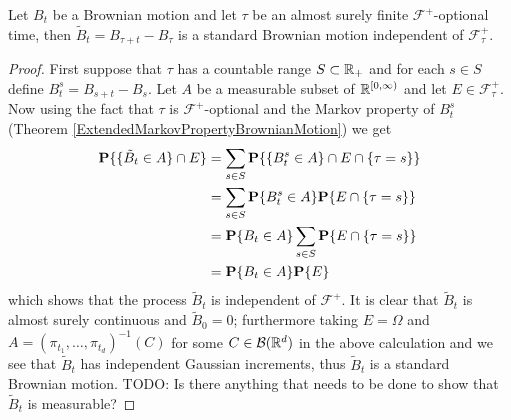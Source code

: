 \begin{thm}\label{StrongMarkovPropertyBrownianMotion}Let $B_t$ be a
  Brownian motion and let $\tau$ be an almost surely finite $\mathcal{F}^+$-optional
  time, then $\tilde{B}_t = B_{\tau + t} - B_\tau$ is a standard Brownian
  motion independent of $\mathcal{F}^+_\tau$.
\end{thm}
\begin{proof}
First suppose that $\tau$ has a countable range $S \subset \mathbb{R}_+$
and for each $s \in S$ define $B^s_t = B_{s+t} - B_s$.
Let $A$ be a
measurable subset of $\mathbb{R}^{[0,\infty)}$ and let $E \in
\mathcal{F}^+_\tau$.  Now using the fact that $\tau$ is
$\mathcal{F}^+$-optional and the Markov property of $B^s_t$ (Theorem
\ref{ExtendedMarkovPropertyBrownianMotion}) we get
\begin{align*}
\textbf{P}\{\lbrace \tilde{B}_t \in A \rbrace \cap E\} &= \sum_{s \in S}
\textbf{P}\{ \lbrace B^s_t
  \in A \rbrace \cap E \cap \lbrace \tau = s \rbrace \} \\
&=\sum_{s \in S} \textbf{P}\{ B^s_t
  \in A \} \textbf{P}\{ E \cap \lbrace \tau = s \rbrace \} \\
&=\textbf{P}\{ B_t
  \in A \} \sum_{s \in S} \textbf{P}\{ E \cap \lbrace \tau = s \rbrace \} \\
&= \textbf{P}\{ B_t  \in A \} \textbf{P}\{ E \} 
\end{align*}
which shows that the process $\tilde{B}_t$ is independent of
$\mathcal{F}^+$.  
It is clear that $\tilde{B}_t$ is almost surely continuous and $\tilde{B}_0 = 0$;
furthermore taking $E = \Omega$ and $A = (\pi_{t_1}, \dotsc,
\pi_{t_d})^{-1}(C)$ for some $C \in \mathcal{B}(\mathbb{R}^d)$ in the above calculation and we see
that $\tilde{B}_t$ has independent Gaussian increments, thus $\tilde{B}_t$ is a
standard Brownian motion.  TODO:  Is there anything that needs to be
done to show that $\tilde{B}_t$ is measurable?


\end{proof}
